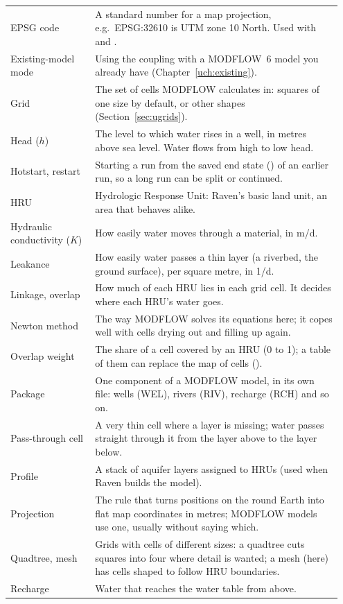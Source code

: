 \begin{longtable}{P{0.24\linewidth}P{0.708\linewidth}}
EPSG code & A standard number for a map projection, e.g.\ EPSG:32610 is UTM zone 10 North. Used with  and .\\
Existing-model mode & Using the coupling with a MODFLOW~6 model you already have (Chapter~\ref{uch:existing}).\\
Grid & The set of cells MODFLOW calculates in: squares of one size by default, or other shapes (Section~\ref{sec:ugrids}).\\
Head ($h$) & The level to which water rises in a well, in metres above sea level. Water flows from high to low head.\\
Hotstart, restart & Starting a run from the saved end state () of an earlier run, so a long run can be split or continued.\\
HRU & Hydrologic Response Unit: Raven's basic land unit, an area that behaves alike.\\
Hydraulic conductivity ($K$) & How easily water moves through a material, in m/d.\\
Leakance & How easily water passes a thin layer (a riverbed, the ground surface), per square metre, in 1/d.\\
Linkage, overlap & How much of each HRU lies in each grid cell. It decides where each HRU's water goes.\\
Newton method & The way MODFLOW solves its equations here; it copes well with cells drying out and filling up again.\\
Overlap weight & The share of a cell covered by an HRU (0 to 1); a table of them can replace the map of cells ().\\
Package & One component of a MODFLOW model, in its own file: wells (WEL), rivers (RIV), recharge (RCH) and so on.\\
Pass-through cell & A very thin cell where a layer is missing; water passes straight through it from the layer above to the layer below.\\
Profile & A stack of aquifer layers assigned to HRUs (used when Raven builds the model).\\
Projection & The rule that turns positions on the round Earth into flat map coordinates in metres; MODFLOW models use one, usually without saying which.\\
Quadtree, mesh & Grids with cells of different sizes: a quadtree cuts squares into four where detail is wanted; a mesh (here) has cells shaped to follow HRU boundaries.\\
Recharge & Water that reaches the water table from above.\\

\end{longtable}
